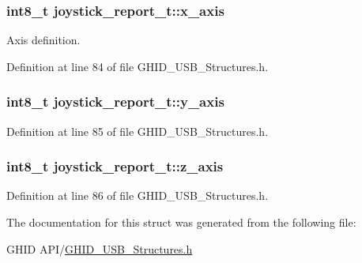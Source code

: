 \hypertarget{structjoystick__report__t_a00eddcf4aba7402e3f0fdd1e7ab09d13}{
\subsubsection[{x\-\_\-axis}]{\setlength{\rightskip}{0pt plus 5cm}int8\-\_\-t {\bf joystick\-\_\-report\-\_\-t\-::x\-\_\-axis}}}\label{structjoystick__report__t_a00eddcf4aba7402e3f0fdd1e7ab09d13}


\-Axis definition. 



\-Definition at line 84 of file \-G\-H\-I\-D\-\_\-\-U\-S\-B\-\_\-\-Structures.\-h.

\hypertarget{structjoystick__report__t_a6abec4aa980f7c029aaaa216c448e7af}{
\subsubsection[{y\-\_\-axis}]{\setlength{\rightskip}{0pt plus 5cm}int8\-\_\-t {\bf joystick\-\_\-report\-\_\-t\-::y\-\_\-axis}}}\label{structjoystick__report__t_a6abec4aa980f7c029aaaa216c448e7af}


\-Definition at line 85 of file \-G\-H\-I\-D\-\_\-\-U\-S\-B\-\_\-\-Structures.\-h.

\hypertarget{structjoystick__report__t_ab213b4d95036f350509ba4e4f056ca97}{
\subsubsection[{z\-\_\-axis}]{\setlength{\rightskip}{0pt plus 5cm}int8\-\_\-t {\bf joystick\-\_\-report\-\_\-t\-::z\-\_\-axis}}}\label{structjoystick__report__t_ab213b4d95036f350509ba4e4f056ca97}


\-Definition at line 86 of file \-G\-H\-I\-D\-\_\-\-U\-S\-B\-\_\-\-Structures.\-h.



\-The documentation for this struct was generated from the following file\-:\begin{DoxyCompactItemize}
\item 
\-G\-H\-I\-D A\-P\-I/\hyperlink{_g_h_i_d___u_s_b___structures_8h}{\-G\-H\-I\-D\-\_\-\-U\-S\-B\-\_\-\-Structures.\-h}\end{DoxyCompactItemize}
